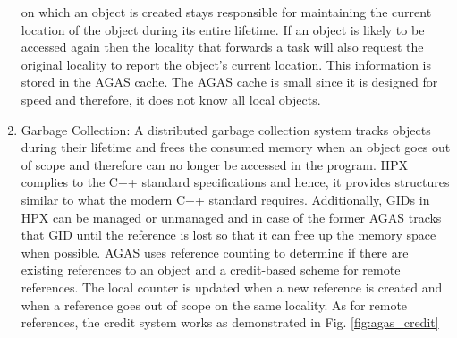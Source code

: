 \begin{enumerate}
{		on which an object is created stays responsible for maintaining the
		current location of the object during its entire lifetime. If an object
		is likely to be accessed again then the locality that forwards a task
		will also request the original locality to report the object's current
		location. This information is stored in the AGAS cache. The AGAS cache
		is small since it is designed for speed and therefore, it does not know
		all local objects.}
    \item{Garbage Collection:
        A distributed garbage collection system tracks objects during their
        lifetime and frees the consumed memory when an object goes out of
        scope and therefore can no longer be accessed in the program. HPX
        complies to the C++ standard specifications and hence, it provides
        structures similar to what the modern C++ standard requires.
        Additionally, GIDs in HPX can be managed or unmanaged and in case of
        the former AGAS tracks that GID until the reference is lost so that it
        can free up the memory space when possible. AGAS uses reference
        counting to determine if there are existing references to an object and
        a credit-based scheme for remote references. The local counter is
        updated when a new reference is created and when a reference goes out
        of scope on the same locality. As for remote references, the credit
        system works as demonstrated in Fig. \ref{fig:agas_credit}}


\end{enumerate}
